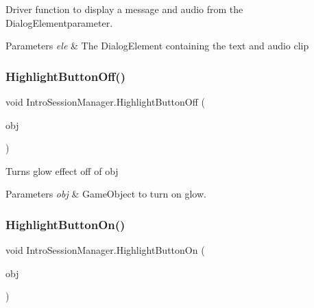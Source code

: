 Driver function to display a message and audio from the {\ttfamily Dialog\+Element{\ttfamily  parameter. }}

{\ttfamily {\ttfamily  }}


\begin{DoxyParams}{Parameters}
{\em ele} & The Dialog\+Element containing the text and audio clip\\
\hline
\end{DoxyParams}
\mbox{\label{class_intro_session_manager_afa85136787b9c937f76f92c22314341d}} 
\subsubsection{\texorpdfstring{Highlight\+Button\+Off()}{HighlightButtonOff()}}
{\footnotesize\ttfamily void Intro\+Session\+Manager.\+Highlight\+Button\+Off (\begin{DoxyParamCaption}\item[{Game\+Object}]{obj }\end{DoxyParamCaption})}



Turns glow effect off of obj 


\begin{DoxyParams}{Parameters}
{\em obj} & Game\+Object to turn on glow.\\
\hline
\end{DoxyParams}
\mbox{\label{class_intro_session_manager_a5f7f82cd17d0cfd8c54abd6dffcde081}} 
\subsubsection{\texorpdfstring{Highlight\+Button\+On()}{HighlightButtonOn()}}
{\footnotesize\ttfamily void Intro\+Session\+Manager.\+Highlight\+Button\+On (\begin{DoxyParamCaption}\item[{Game\+Object}]{obj }\end{DoxyParamCaption})}

